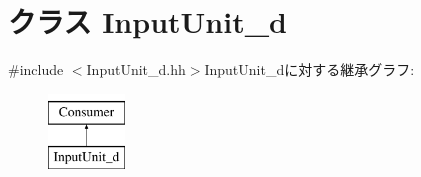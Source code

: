 \hypertarget{classInputUnit__d}{
\section{クラス InputUnit\_\-d}
\label{classInputUnit__d}
}


{\ttfamily \#include $<$InputUnit\_\-d.hh$>$}InputUnit\_\-dに対する継承グラフ:\begin{figure}[H]
\begin{center}
\leavevmode
\includegraphics[height=2cm]{classInputUnit__d}
\end{center}
\end{figure}

